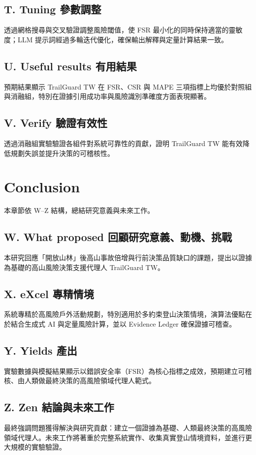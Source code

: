 \documentclass[12pt,a4paper]{article}
\begin{document}
\subsection*{T. Tuning 參數調整}
透過網格搜尋與交叉驗證調整風險閾值，使 FSR 最小化的同時保持適當的靈敏度；LLM 提示詞經過多輪迭代優化，確保輸出解釋與定量計算結果一致。

\subsection*{U. Useful results 有用結果}
預期結果顯示 TrailGuard TW 在 FSR、CSR 與 MAPE 三項指標上均優於對照組與消融組，特別在證據引用成功率與風險識別準確度方面表現顯著。

\subsection*{V. Verify 驗證有效性}
透過消融組實驗驗證各組件對系統可靠性的貢獻，證明 TrailGuard TW 能有效降低規劃失誤並提升決策的可稽核性。

\section{Conclusion}
本章節依 W–Z 結構，總結研究意義與未來工作。

\subsection*{W. What proposed 回顧研究意義、動機、挑戰}
本研究回應「開放山林」後高山事故倍增與行前決策品質缺口的課題，提出以證據為基礎的高山風險決策支援代理人 TrailGuard TW。

\subsection*{X. eXcel 專精情境}
系統專精於高風險戶外活動規劃，特別適用於多約束登山決策情境，演算法優點在於結合生成式 AI 與定量風險計算，並以 Evidence Ledger 確保證據可稽查。

\subsection*{Y. Yields 產出}
實驗數據與模擬結果顯示以錯誤安全率（FSR）為核心指標之成效，預期建立可稽核、由人類做最終決策的高風險領域代理人範式。

\subsection*{Z. Zen 結論與未來工作}
最終強調問題獲得解決與研究貢獻：建立一個證據為基礎、人類最終決策的高風險領域代理人。未來工作將著重於完整系統實作、收集真實登山情境資料，並進行更大規模的實驗驗證。
\end{document}
